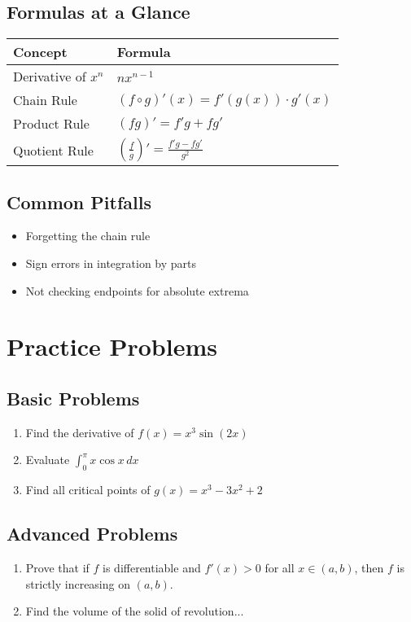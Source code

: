\documentclass[11pt,a4paper]{article}
\newcommand{\important}[1]{\textbf{\textcolor{red}{#1}}}
\begin{document}
\subsection{Formulas at a Glance}
\begin{center}
\begin{tabular}{|l|l|}
\hline
\textbf{Concept} & \textbf{Formula} \\
\hline
Derivative of $x^n$ & $nx^{n-1}$ \\
\hline
Chain Rule & $(f \circ g)'(x) = f'(g(x)) \cdot g'(x)$ \\
\hline
Product Rule & $(fg)' = f'g + fg'$ \\
\hline
Quotient Rule & $\left(\frac{f}{g}\right)' = \frac{f'g - fg'}{g^2}$ \\
\hline
\end{tabular}
\end{center}

\subsection{Common Pitfalls}
\begin{itemize}
    \item[\important{}] Forgetting the chain rule
    \item[\important{}] Sign errors in integration by parts
    \item[\important{}] Not checking endpoints for absolute extrema
\end{itemize}

\section{Practice Problems}

\subsection{Basic Problems}
\begin{enumerate}
    \item Find the derivative of $f(x) = x^3 \sin(2x)$
    \item Evaluate $\int_0^{\pi} x \cos x\,dx$
    \item Find all critical points of $g(x) = x^3 - 3x^2 + 2$
\end{enumerate}

\subsection{Advanced Problems}
\begin{enumerate}
    \item Prove that if $f$ is differentiable and $f'(x) > 0$ for all $x \in (a,b)$, 
          then $f$ is strictly increasing on $(a,b)$.
    \item Find the volume of the solid of revolution...
\end{enumerate}
\end{document}
